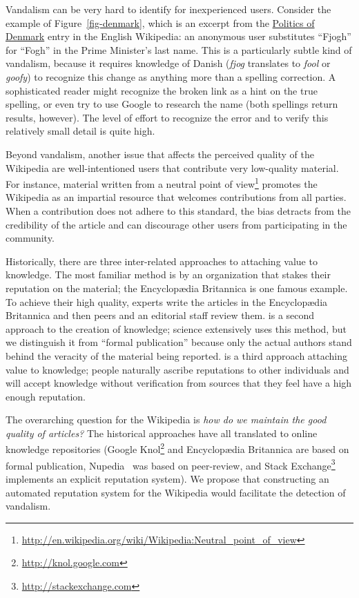 Vandalism can be very hard to identify for inexperienced users.
Consider the example of Figure~\ref{fig-denmark},
which is an excerpt from the \underline{Politics of Denmark}
entry in the English Wikipedia: an anonymous user substitutes
``Fjogh'' for ``Fogh'' in the Prime Minister's last name.
This is a particularly subtle kind of vandalism,
because it requires knowledge of Danish
(\textit{fjog} translates to \textit{fool} or \textit{goofy})
to recognize this change as anything more than a spelling correction.
A sophisticated reader might recognize the broken link
as a hint on the true spelling, or even try to use Google
to research the name (both spellings return results, however).
The level of effort to recognize the error and to
verify this relatively small detail is quite high.

Beyond vandalism, another issue that affects the perceived
quality of the Wikipedia are well-intentioned users that contribute
very low-quality material.
For instance, material written from a
neutral point of view\footnote{\url{http://en.wikipedia.org/wiki/Wikipedia:Neutral_point_of_view}}
promotes the Wikipedia as an impartial resource that welcomes contributions
from all parties.
When a contribution does not adhere to this standard, the bias
detracts from the credibility of the article and can discourage
other users from participating in the community.

Historically, there are three inter-related approaches to
attaching value to knowledge.
The most familiar method is  by an organization
that stakes their reputation on the material;
the Encyclop{\ae}dia Britannica is one famous example.
To achieve their high quality, experts write the articles in the
Encyclop{\ae}dia Britannica
and then peers and an editorial staff review them.
 is a second approach to the creation of
knowledge; science extensively uses this method,
but we distinguish it from ``formal publication'' because
only the actual authors stand behind the veracity of the
material being reported.
 is a third approach attaching value
to knowledge; people naturally ascribe reputations to other
individuals and will accept knowledge without verification from
sources that they feel have a high enough reputation.

The overarching question for the Wikipedia is
\textit{how do we maintain the good quality of articles?}
The historical approaches have all translated to online
knowledge repositories (\eg Google Knol\footnote{\url{http://knol.google.com}}
and Encyclop{\ae}dia Britannica
are based on formal publication,
Nupedia~\cite{wiki:Nupedia}
was based on peer-review,
and Stack Exchange\footnote{\url{http://stackexchange.com}}
implements an explicit reputation system).
We propose that constructing an automated reputation system
for the Wikipedia would facilitate the detection of vandalism.

